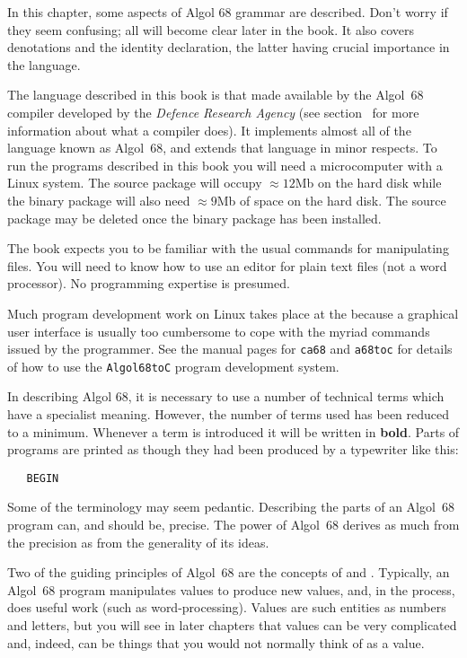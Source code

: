 In this chapter, some aspects of Algol 68 grammar are described.
Don't worry if they seem confusing; all will become clear later in
the book.  It also covers denotations and the identity declaration,
the latter having crucial importance in the language.

The language described in this book is that made available by the
 Algol~68 compiler developed by the
\emph{Defence Research Agency} (see section~ for more
information about what a compiler does).  It implements almost all of
the language known as Algol~68, and extends that language in minor
respects.  To run the programs described in this book you will need a
microcomputer with a Linux system. The source package will occupy
$\approx12$Mb on the hard disk while the binary package will also need
$\approx9$Mb of space on the hard disk. The source package may be
deleted once the binary package has been installed.

The book expects you to be familiar with the usual commands for
manipulating files. You will need to know how to use an editor for
plain text files (not a word processor).  No programming expertise is
presumed.

Much program development work on Linux takes place at the
 because a graphical user interface is usually too
cumbersome to
cope with the myriad commands issued by the programmer.  See the
manual pages for \verb|ca68| and \verb|a68toc| for details of how to
use the \verb|Algol68toC| program development system.

In describing Algol 68, it is necessary to use a number of technical
terms which have a specialist meaning. However, the number of terms
used has been reduced to a minimum. Whenever a term is introduced it
will be written in \textbf{bold}. Parts of programs are printed as though
they had been produced by a typewriter like this:
\begin{verbatim}
   BEGIN
\end{verbatim}
\noindent
Some of the terminology may seem pedantic. Describing the parts of an
Algol~68 program can, and should be, precise. The power of Algol~68
derives as much from the precision as from the generality of its ideas.

Two of the guiding principles of Algol~68 are the concepts of
 and .  Typically, an Algol~68 program
manipulates values to produce new values, and, in the process, does
useful work (such as word-processing). Values are such entities as
numbers and letters, but you will see in later chapters that values
can be very complicated and, indeed, can be things that you would not
normally think of as a value.


